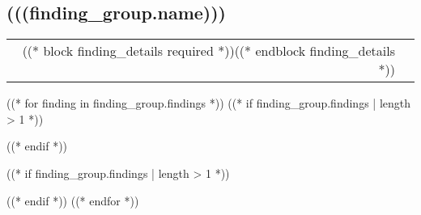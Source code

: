 \subsection{(((finding_group.name)))}

\begin{tcolorbox}
\begin{longtable}{ r l }
  ((* block finding_details required *))((* endblock finding_details *))
\end{longtable}
\end{tcolorbox}

((* for finding in finding_group.findings *))
  ((* if finding_group.findings | length > 1 *))
    \begin{tcolorbox}[title={((( finding.name )))\hfill ( (((-  finding.risks[version].value | capitalize -))) )}]
  ((* endif *))
    
  ((* if finding_group.findings | length > 1 *))
    \end{tcolorbox}
  ((* endif *))
((* endfor *))